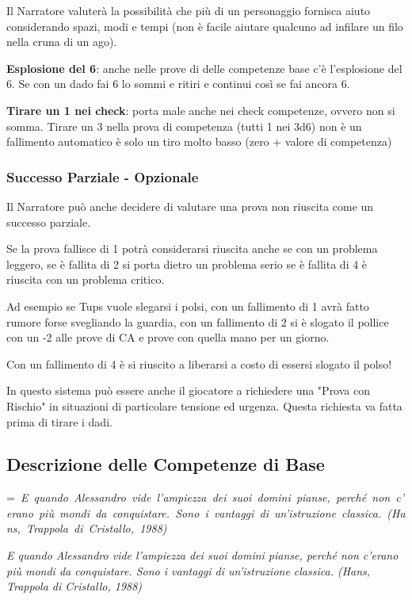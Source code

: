 \documentclass[a4paper,11pt,twoside,openany]{book}
\makeatletter
\newcommand{\mybox}[1]{%
	\setbox0=\hbox{#1}%
	\setlength{\@tempdima}{\dimexpr\wd0+13pt}%
	\begin{tcolorbox}[boxrule=0.5pt,arc=4pt, breakable,enhanced,
		left=6pt,right=6pt,top=6pt,bottom=6pt,boxsep=0pt,width=\@tempdima]
		#1
	\end{tcolorbox}
}
\makeatother
\begin{document}
Il Narratore valuterà la possibilità che più di un personaggio fornisca aiuto considerando spazi, modi e tempi (non è facile aiutare qualcuno ad infilare un filo nella cruna di un ago).

\textbf{Esplosione del 6}: anche nelle prove di delle competenze base c'è l'esplosione del 6. Se con un dado fai 6 lo sommi e ritiri e continui così se fai ancora 6.

\textbf{Tirare un 1 nei check}: porta male anche nei check competenze, ovvero non si somma.
Tirare un 3 nella prova di competenza (tutti 1 nei 3d6) non è un fallimento automatico è solo un tiro molto basso (zero + valore di competenza)

\subsubsection{Successo Parziale - Opzionale}

Il Narratore può anche decidere di valutare una prova non riuscita come un successo parziale.

Se la prova fallisce di 1 potrà considerarsi riuscita anche se con un problema leggero, se è fallita di 2 si porta dietro un problema serio se è fallita di 4 è riuscita con un problema critico.

Ad esempio se Tups vuole slegarsi i polsi, con un fallimento di 1 avrà fatto rumore forse svegliando la guardia, con un fallimento di 2 si è slogato il pollice con un -2 alle prove di CA e prove con quella mano per un giorno.

Con un fallimento di 4 è si riuscito a liberarsi a costo di essersi slogato il polso!


In questo sistema può essere anche il giocatore a richiedere una "Prova con Rischio" in situazioni di particolare tensione ed urgenza. Questa richiesta va fatta prima di tirare i dadi.

\pagebreak

\subsection{Descrizione delle Competenze di Base}

\label{descrizione-delle-competenze-di-base}
\mybox{\textit{
E quando Alessandro vide l'ampiezza dei suoi domini pianse, perché non c'erano più mondi da conquistare. Sono i vantaggi di un'istruzione classica. (Hans, Trappola di Cristallo, 1988)
}}\medskip
\end{document}
